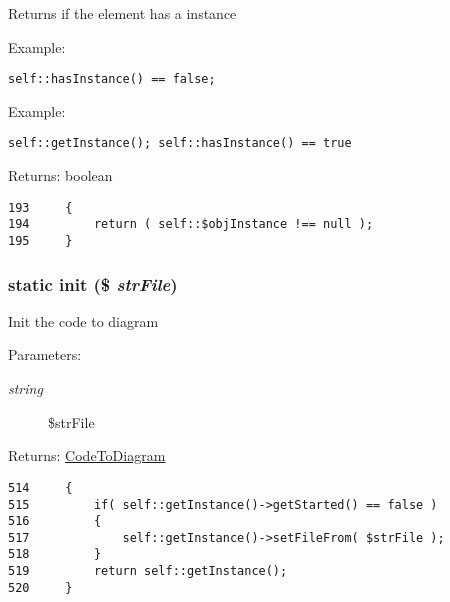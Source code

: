 Returns if the element has a instance

\begin{Desc}
\item[Example:]\end{Desc}
{\tt  self::hasInstance() == false; } \begin{Desc}
\item[Example:]\end{Desc}
{\tt  self::getInstance(); self::hasInstance() == true }

\begin{Desc}
\item[Returns:]boolean \end{Desc}


\begin{Code}\begin{verbatim}193     {
194         return ( self::$objInstance !== null );
195     }
\end{verbatim}
\end{Code}


\hypertarget{class_code_to_diagram_f20af03286d73d30d03d593cc88babd9}{
\subsubsection[{init}]{\setlength{\rightskip}{0pt plus 5cm}static init (\$ {\em strFile})}}
\label{class_code_to_diagram_f20af03286d73d30d03d593cc88babd9}


Init the code to diagram

\begin{Desc}
\item[Parameters:]
\begin{description}
\item[{\em string}]\$strFile \end{description}
\end{Desc}
\begin{Desc}
\item[Returns:]\hyperlink{class_code_to_diagram}{CodeToDiagram} \end{Desc}


\begin{Code}\begin{verbatim}514     {
515         if( self::getInstance()->getStarted() == false )
516         {
517             self::getInstance()->setFileFrom( $strFile );
518         }
519         return self::getInstance();
520     }
\end{verbatim}
\end{Code}


